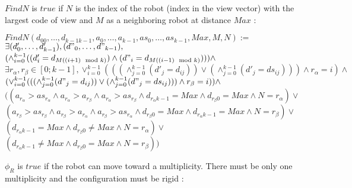 \documentclass{article}
\begin{document}
$FindN$ is $true$ if $N$ is the index of the robot (index in the view vector) with the largest code of view and $M$ as a neighboring robot at distance $Max$ :

\begin{center}

$FindN(d_{00}, \ldots ,d_{k-1k-1}, a_{0}, \ldots , a_{k-1}, as_{0}, \ldots , as_{k-1}, Max, M, N):=$\\
$\exists (d'_{0}, \ldots , d'_{k-1}), (d"_{0}, \ldots , d"_{k-1}),$\\
$(\land_{i=0}^{k-1} ((d'_{i} = d_{M((i+1)\mod{k})}) \land (d"_{i} = d_{M((i-1)\mod{k})}))) \land$\\
$\exists r_{\alpha}, r_{\beta} \in [0; k-1], \lor_{i=0}^{k-1}(((\land_{j=0}^{k-1}(d'_{j} = d_{ij})) \lor
(\land_{j=0}^{k-1}(d'_{j} = ds_{ij}) ))
\land r_{\alpha} = i )\land$\\
$(\lor_{i=0}^{k-1}(((\land_{j=0}^{k-1}(d"_{j} = d_{ij})) \lor
(\land_{j=0}^{k-1}(d"_{j} = ds_{ij}) ))
\land r_{\beta} = i )) \land$\\
$((a_{r_\alpha} > as_{r_\alpha} \land a_{r_\alpha} > a_{r_\beta} \land a_{r_\alpha} > as_{r_\beta}
\land d_{r_{\alpha}k-1} = Max \land d_{r_{\beta}0} = Max
\land N = r_{\alpha}) \lor$\\
$(a_{r_\beta} > as_{r_\beta} \land a_{r_\beta} > a_{r_\alpha} \land a_{r_\beta} > as_{r_\alpha} 
\land d_{r_{\beta}0} = Max \land d_{r_{\alpha}k-1} = Max
\land N = r_{\beta}) \lor$\\
$(d_{r_{\alpha}k-1} = Max \land d_{r_{\beta}0} \not= Max \land N = r_{\alpha}) \lor$\\
$(d_{r_{\alpha}k-1} \not= Max \land d_{r_{\beta}0} = Max \land N = r_{\beta}))$
\end{center}

$\phi_R$ is $true$ if the robot can move toward a multiplicity. There must be only one multiplicity and the configuration must be rigid :
\end{document}
